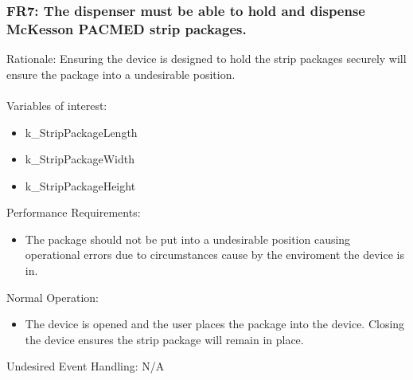 \documentclass[12pt]{article}
\begin{document}
\subsubsection*{FR7: The dispenser must be able to hold and dispense McKesson PACMED strip packages.}
Rationale: Ensuring the device is designed to hold the strip packages securely will ensure the package into a undesirable position.
\\\\
Variables of interest:
\begin{itemize}[noitemsep,topsep=0pt]
    \item k\_StripPackageLength
    \item k\_StripPackageWidth
    \item k\_StripPackageHeight
\end{itemize} 
\bigskip
Performance Requirements:
\begin{itemize}[noitemsep,topsep=0pt]
    \item The package should not be put into a undesirable position causing operational errors due to circumstances cause by the enviroment the device is in.
\end{itemize}
\bigskip
Normal Operation:
\begin{itemize}[noitemsep,topsep=0pt]
    \item The device is opened and the user places the package into the device. Closing the device ensures the strip package will remain in place.
\end{itemize}
\bigskip
Undesired Event Handling: N/A
\\\\

\end{document}
